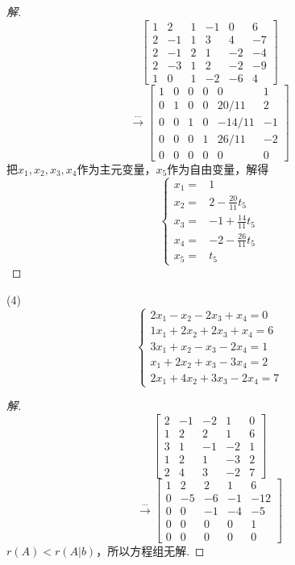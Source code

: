 \documentclass[10pt,a4paper]{report}
\begin{document}
\begin{proof}[解]
	$$
	\left[
	\begin{matrix}
	1 & 2 & 1 & -1 & 0 & 6\\
	2 & -1 & 1 & 3 & 4 & -7\\
	2 & -1 & 2 & 1 & -2 & -4\\
	2 & -3 & 1 & 2 & -2 & -9 \\
	1 & 0 & 1 & -2 & -6 & 4
	\end{matrix}
	\right]
	$$
	$$
	\xrightarrow{...}
	\left[
	\begin{matrix}
	1 & 0 & 0 & 0 & 0 & 1\\
	0 & 1 & 0 & 0 & 20/11 & 2\\
	0 & 0 & 1 & 0 & -14/11 & -1\\
	0 & 0 & 0 & 1 & 26/11 & -2 \\
	0 & 0 & 0 & 0 & 0 & 0
	\end{matrix}
	\right]
	$$
	把$x_{1},x_{2},x_{3},x_{4}$作为主元变量，$x_{5}$作为自由变量，解得
	$$
	\left\{
	\begin{aligned}
	x_{1} = & 1 \\
	x_{2} = & 2-\frac{20}{11}t_{5} \\
	x_{3} = & -1+\frac{14}{11}t_{5} \\
	x_{4} = & -2-\frac{26}{11}t_{5} \\
	x_{5} = & t_{5}
	\end{aligned}
	\right.
	$$
\end{proof}
\noindent (4)
$$
\left\{
\begin{aligned}
2x_{1}-x_{2}-2x_{3}+x_{4}=0\\
1x_{1}+2x_{2}+2x_{3}+x_{4}=6\\
3x_{1}+x_{2}-x_{3}-2x_{4}=1\\
x_{1}+2x_{2}+x_{3}-3x_{4}=2\\
2x_{1}+4x_{2}+3x_{3}-2x_{4}=7
\end{aligned}
\right.
$$
\begin{proof}[解]
	$$
	\left[
	\begin{matrix}
	2 & -1 & -2 & 1 & 0\\
	1 & 2 & 2 & 1 & 6\\
	3 & 1 & -1 & -2 & 1\\
	1 & 2 & 1 & -3 & 2\\
	2 & 4 & 3 & -2 & 7
	\end{matrix}
	\right]
	$$
	$$
	\xrightarrow{...}
	\left[
	\begin{matrix}
	1 & 2 & 2 & 1 & 6\\
	0 & -5 & -6 & -1 & -12\\
	0 & 0 & -1 & -4 & -5\\
    0 & 0 & 0 & 0 & 1\\
	0 & 0 & 0 & 0 & 0
	\end{matrix}
	\right]
	$$
	$r(A) < r(A|b)$，所以方程组无解.
\end{proof}
\end{document}
